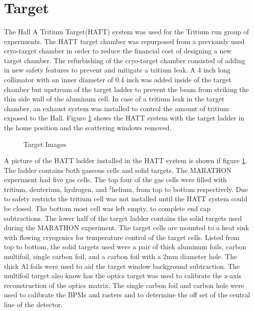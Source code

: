 \section{Target}\label{sec:target}
\paragraph{} The Hall A Tritium Target(HATT) system was used for the Tritium run group of experiments. The HATT target chamber was repurposed from a previously used cryo-target chamber in order to reduce the financial cost of designing a new target chamber. The refurbishing of the cryo-target chamber consisted of adding in new safety features to prevent and mitigate a tritium leak.  A 4 inch long collimator with an inner diameter of 0.4 inch was added inside of the target chamber but upstream of the target ladder to prevent the beam from striking the thin side wall of the aluminum cell. In case of a tritium leak in the target chamber, an exhaust system was installed to control the amount of tritium exposed to the Hall.\cite{HATT_eng}  Figure \ref{HATT} shows the HATT system with the target ladder in the home position and the scattering windows removed. 
\begin{figure}[t]
	\centering
	\caption{Target Images}
	\hspace*{-20pt}
	\centering
	\label{HATT}


\end{figure}
A picture of the HATT ladder installed in the HATT system is shown if figure \ref{HATT}. The ladder contains both gaseous cells and solid targets. The MARATHON experiment had five gas cells. The top four of the gas cells were filled with tritium, deuterium, hydrogen, and $^3$helium, from top to bottom respectively. Due to safety restricts the tritium cell was not installed until the HATT system could be closed. The bottom most cell was left empty, to complete end cap subtractions. The lower half of the target ladder contains the solid targets used during the MARATHON experiment. The target cells are mounted to a heat sink with flowing cryogenics for temperature control of the target cells. Listed from top to bottom, the solid targets used were a pair of thick aluminum foils, carbon multifoil, single carbon foil, and a carbon foil with a 2mm diameter hole. The thick Al foils were used to aid the target window background subtraction. The multifoil target also know has the optics target was used to calibrate the z-axis  reconstruction of the optics matrix. The single carbon foil and carbon hole were used to calibrate the BPMs and rasters and to determine the off set of the central line of the detector. 

